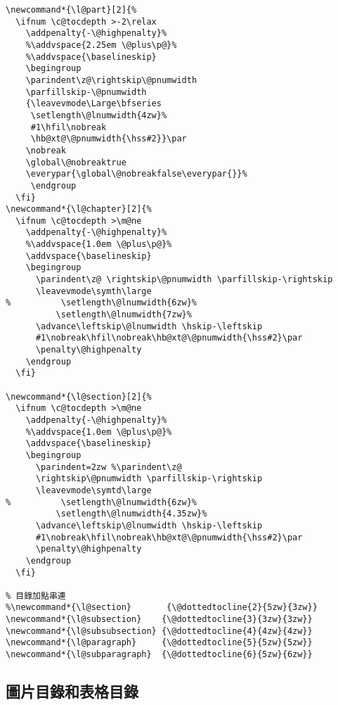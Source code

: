 \begin{lstlisting}[firstnumber=1364]
\newcommand*{\l@part}[2]{%
  \ifnum \c@tocdepth >-2\relax
    \addpenalty{-\@highpenalty}%
    %\addvspace{2.25em \@plus\p@}%
    %\addvspace{\baselineskip}
    \begingroup
    \parindent\z@\rightskip\@pnumwidth
    \parfillskip-\@pnumwidth
    {\leavevmode\Large\bfseries
     \setlength\@lnumwidth{4zw}%
     #1\hfil\nobreak
     \hb@xt@\@pnumwidth{\hss#2}}\par
    \nobreak
    \global\@nobreaktrue
    \everypar{\global\@nobreakfalse\everypar{}}%
     \endgroup
  \fi}
\newcommand*{\l@chapter}[2]{%
  \ifnum \c@tocdepth >\m@ne
    \addpenalty{-\@highpenalty}%
    %\addvspace{1.0em \@plus\p@}%
    \addvspace{\baselineskip}
    \begingroup
      \parindent\z@ \rightskip\@pnumwidth \parfillskip-\rightskip
      \leavevmode\symth\large
%          \setlength\@lnumwidth{6zw}%
          \setlength\@lnumwidth{7zw}%
      \advance\leftskip\@lnumwidth \hskip-\leftskip
      #1\nobreak\hfil\nobreak\hb@xt@\@pnumwidth{\hss#2}\par
      \penalty\@highpenalty
    \endgroup
  \fi}

\newcommand*{\l@section}[2]{%
  \ifnum \c@tocdepth >\m@ne
    \addpenalty{-\@highpenalty}%
    %\addvspace{1.0em \@plus\p@}%
    \addvspace{\baselineskip}
    \begingroup
      \parindent=2zw %\parindent\z@
      \rightskip\@pnumwidth \parfillskip-\rightskip
      \leavevmode\symtd\large
%          \setlength\@lnumwidth{6zw}%
          \setlength\@lnumwidth{4.35zw}%
      \advance\leftskip\@lnumwidth \hskip-\leftskip
      #1\nobreak\hfil\nobreak\hb@xt@\@pnumwidth{\hss#2}\par
      \penalty\@highpenalty
    \endgroup
  \fi}

% 目錄加點串連
%\newcommand*{\l@section}       {\@dottedtocline{2}{5zw}{3zw}}
\newcommand*{\l@subsection}    {\@dottedtocline{3}{3zw}{3zw}}
\newcommand*{\l@subsubsection} {\@dottedtocline{4}{4zw}{4zw}}
\newcommand*{\l@paragraph}     {\@dottedtocline{5}{5zw}{5zw}}
\newcommand*{\l@subparagraph}  {\@dottedtocline{6}{5zw}{6zw}}
\end{lstlisting}

\subsection{圖片目錄和表格目錄}

